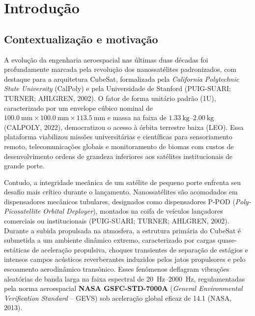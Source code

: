 \chapter{Introdução}
\label{cap:introducao}

\section{Contextualização e motivação}
\label{sec:contextualizacao}

A evolução da engenharia aeroespacial nas últimas duas décadas foi profundamente marcada pela revolução dos nanossatélites padronizados, com destaque para a arquitetura CubeSat, formalizada pela \textit{California Polytechnic State University} (CalPoly) e pela Universidade de Stanford (PUIG-SUARI; TURNER; AHLGREN, 2002). O fator de forma unitário padrão (1U), caracterizado por um envelope cúbico nominal de $\SI{100.0}{\milli\metre} \times \SI{100.0}{\milli\metre} \times \SI{113.5}{\milli\metre}$ e massa na faixa de $\SIrange{1.33}{2.00}{\kilo\gram}$ (CALPOLY, 2022), democratizou o acesso à órbita terrestre baixa (LEO). Essa plataforma viabilizou missões universitárias e científicas para sensoriamento remoto, telecomunicações globais e monitoramento de biomas com custos de desenvolvimento ordens de grandeza inferiores aos satélites institucionais de grande porte.

Contudo, a integridade mecânica de um satélite de pequeno porte enfrenta seu desafio mais crítico durante o lançamento. Nanossatélites são acomodados em dispensadores mecânicos tubulares, designados como dispensadores P-POD (\textit{Poly-Picosatellite Orbital Deployer}), montados na coifa de veículos lançadores comerciais ou institucionais (PUIG-SUARI; TURNER; AHLGREN, 2002). Durante a subida propulsada na atmosfera, a estrutura primária do CubeSat é submetida a um ambiente dinâmico extremo, caracterizado por cargas quase-estáticas de aceleração propulsiva, choques transientes de separação de estágios e intensos campos acústicos reverberantes induzidos pelos jatos propulsores e pelo escoamento aerodinâmico transônico. Esses fenômenos deflagram vibrações aleatórias de banda larga na faixa espectral de \SIrange{20}{2000}{\hertz}, regulamentadas pela norma aeroespacial \textbf{NASA GSFC-STD-7000A} (\textit{General Environmental Verification Standard} -- GEVS) sob aceleração global eficaz de \SI{14.1}{\Grms} (NASA, 2013).

